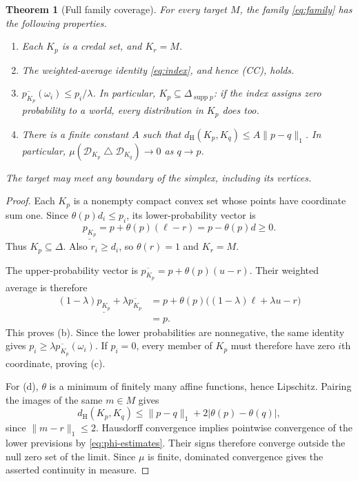 \documentclass[11pt]{article}
\newtheorem{theorem}{Theorem}
\theoremstyle{remark}
\newcommand{\supp}{\operatorname{supp}}
\newcommand{\sd}{\mathbin{\triangle}}
\newcommand{\dH}{d_{\mathrm H}}
\newcommand{\Dscr}{\mathcal D}
\newcommand{\lowprob}[1]{\underline{p_{#1}}}
\newcommand{\upprob}[1]{\overline{p_{#1}}}
\begin{document}
\begin{theorem}[Full family coverage]\label{thm:family}
For every target $M$, the family \eqref{eq:family} has the following properties.
\begin{enumerate}[label=(\alph*)]
\item Each $K_p$ is a credal set, and $K_r=M$.
\item The weighted-average identity \eqref{eq:index}, and hence (CC), holds.
\item $\upprob{K_p}(\omega_i)\le p_i/\lambda$. In particular,
$K_p\subseteq\Delta_{\supp p}$: if the index assigns zero probability
to a world, every distribution in $K_p$ does too.
\item There is a finite constant $A$ such that
$\dH(K_p,K_q)\le A\|p-q\|_1$. In particular,
$\mu(\Dscr_{K_p}\sd \Dscr_{K_q})\to0$ as $q\to p$.
\end{enumerate}
The target may meet any boundary of the simplex, including its vertices.
\end{theorem}
\begin{proof}
Each $K_p$ is a nonempty compact convex set whose points have coordinate sum
one. Since $\theta(p)d_i\le p_i$, its lower-probability vector is
\[
 \lowprob{K_p}=p+\theta(p)(\ell-r)=p-\theta(p)d\ge0.
\]
Thus $K_p\subseteq\Delta$. Also $r_i\ge d_i$, so $\theta(r)=1$ and $K_r=M$.

The upper-probability vector is $\upprob{K_p}=p+\theta(p)(u-r)$. Their weighted
average is therefore
\[
 \begin{aligned}
 (1-\lambda)\lowprob{K_p}+\lambda\upprob{K_p}
 &=p+\theta(p)\big((1-\lambda)\ell+\lambda u-r\big)\\
 &=p.
 \end{aligned}
\]
This proves (b). Since the lower probabilities are nonnegative, the same identity
gives $p_i\ge\lambda\upprob{K_p}(\omega_i)$. If $p_i=0$, every member of $K_p$ must
therefore have zero $i$th coordinate, proving (c).

For (d), $\theta$ is a minimum of finitely many affine functions, hence
Lipschitz. Pairing the images of the same $m\in M$ gives
\begin{equation}
 \dH(K_p,K_q)\le\|p-q\|_1+2|\theta(p)-\theta(q)|,\label{eq:hausdorff}
\end{equation}
since $\|m-r\|_1\le2$. Hausdorff convergence implies pointwise convergence
of the lower previsions by \eqref{eq:phi-estimates}. Their signs therefore
converge outside the null zero set of the limit. Since $\mu$ is finite,
dominated convergence gives the asserted continuity in measure.
\end{proof}
\end{document}
